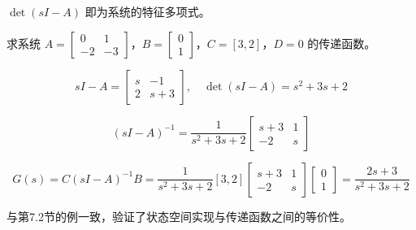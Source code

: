 $\det(sI - A)$ 即为系统的特征多项式。

\begin{example}
求系统 $A = \begin{bmatrix} 0 & 1 \\ -2 & -3 \end{bmatrix}$，$B = \begin{bmatrix} 0 \\ 1 \end{bmatrix}$，$C = [3, 2]$，$D=0$ 的传递函数。

\[
sI - A = \begin{bmatrix} s & -1 \\ 2 & s+3 \end{bmatrix},\quad
\det(sI - A) = s^2 + 3s + 2
\]

\[
(sI - A)^{-1} = \frac{1}{s^2+3s+2}\begin{bmatrix} s+3 & 1 \\ -2 & s \end{bmatrix}
\]

\[
G(s) = C(sI-A)^{-1}B = \frac{1}{s^2+3s+2}[3, 2]\begin{bmatrix} s+3 & 1 \\ -2 & s \end{bmatrix}\begin{bmatrix} 0 \\ 1 \end{bmatrix} = \frac{2s+3}{s^2+3s+2}
\]

与第7.2节的例一致，验证了状态空间实现与传递函数之间的等价性。
\end{example}

